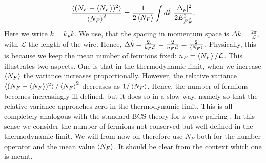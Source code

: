 \begin{equation}
\frac{\braket{(N_F-\braket{N_F})^2}}{\braket{N_F}^2} = \frac{1}{2\braket{N_F}}\int d\tilde{k} \; \frac{|\Delta_{\tilde{k}}|^2}{2E^2_{F,\tilde{k}}}. \nonumber
\end{equation}
Here we write $k = k_F \tilde{k}$. We use, that the spacing in momentum space is $\Delta k = \frac{2\pi}{\mathcal{L}}$, with $\mathcal{L}$ the length of the wire. Hence, $\Delta \tilde{k} = \frac{2\pi}{k_F\mathcal{L}} = \frac{2}{n_F\mathcal{L}} = \frac{2}{\braket{N_F}}$. Physically, this is because we keep the mean number of fermions fixed: $n_F = \braket{N_F}/\mathcal{L}$. This illustrates two aspects. One is that in the thermodynamic limit, when we increase $\braket{N_F}$ the variance increases proportionally. However, the relative variance $\braket{(N_F-\braket{N_F})^2}/\braket{N_F}^2$ decreases as $1/\braket{N_F}$. Hence, the number of fermions becomes increasingly ill-defined, but it does so in a slow way, namely so that the relative variance approaches zero in the thermodynamic limit. This is all completely analogous with the standard BCS theory for $s$-wave pairing \cite[pp. 50-52]{Tinkham}. In this sense we consider the number of fermions not conserved but well-defined in the thermodynamic limit. We will from now on therefore use $N_F$ both for the number operator and the mean value $\braket{N_F}$. It should be clear from the context which one is meant.   


